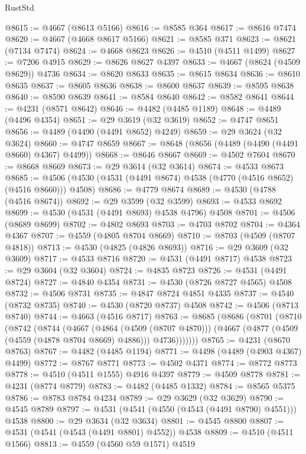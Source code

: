 \begin{lexlean}{RustStd}
\begin{coremodule}
@8615 := @4667 (@8613 @5166)
@8616 := @8585 @364
@8617 := @8616 @7474
@8620 := @4667 (@4668 @8617 @5166)
@8621 := @8585 @371
@8623 := @8621 (@7134 @7474)
@8624 := @4668 @8623
@8626 := @4510 (@4511 @1499)
@8627 := @7206 @4915
@8629 := @8626 @8627 @4397
@8633 := @4667 (@8624 (@4509 @8629)) @4736
@8634 := @8620 @8633
@8635 := @8615 @8634
@8636 := @8610 @8635
@8637 := @8605 @8636
@8638 := @8600 @8637
@8639 := @8595 @8638
@8640 := @8590 @8639
@8641 := @8584 @8640
@8642 := @8582 @8641
@8644 := @4231 (@8571 @8642)
@8646 := @4482 (@4485 @1189)
@8648 := @4489 (@4496 @4354)
@8651 := @29 @3619 (@32 @3619)
@8652 := @4747 @8651
@8656 := @4489 (@4490 (@4491 @8652) @4249)
@8659 := @29 @3624 (@32 @3624)
@8660 := @4747 @8659
@8667 := @8648 (@8656 (@4489 (@4490 (@4491 @8660) @4367) @4499))
@8668 := @8646 @8667
@8669 := @4502 @7604
@8670 := @8668 @8669
@8673 := @29 @3614 (@32 @3614)
@8674 := @4533 @8673
@8685 := @4506 (@4530 (@4531 (@4491 @8674) @4538 (@4770 (@4516 @8652) (@4516 @8660))) @4508)
@8686 := @4779 @8674
@8689 := @4530 (@4788 (@4516 @8674))
@8692 := @29 @3599 (@32 @3599)
@8693 := @4533 @8692
@8699 := @4530 (@4531 (@4491 @8693) @4538 @4796) @4508
@8701 := @4506 (@8689 @8699)
@8702 := @4802 @8693
@8703 := @4703 @8702
@8704 := @4364 @4367
@8707 := @4559 (@4805 @8704 @8669)
@8710 := @8703 (@4509 (@8707 @4818))
@8713 := @4530 (@4825 (@4826 @8693))
@8716 := @29 @3609 (@32 @3609)
@8717 := @4533 @8716
@8720 := @4531 (@4491 @8717) @4538
@8723 := @29 @3604 (@32 @3604)
@8724 := @4835 @8723
@8726 := @4531 (@4491 @8724)
@8727 := @4840 @4354
@8731 := @4530 (@8726 @8727 @4565) @4508
@8732 := @4506 @8731
@8735 := @4847 @8724 @4851 @4335
@8737 := @4540 (@8732 @8735)
@8740 := @4530 (@8720 @8737) @4508
@8742 := @4506 (@8713 @8740)
@8744 := @4663 (@4516 @8717)
@8763 := @8685
    (@8686
      (@8701
        (@8710
          (@8742
            (@8744
              (@4667
                (@4864 (@4509 (@8707 @4870)))
                (@4667 (@4877 (@4509 (@4559 (@4878 @8704 @8669) @4886))) @4736)))))))
@8765 := @4231 (@8670 @8763)
@8767 := @4482 (@4485 @1194)
@8771 := @4498 (@4489 (@4903 @4367) @4499)
@8772 := @8767 @8771
@8773 := @4502 @4371
@8774 := @8772 @8773
@8778 := @4510 (@4511 @1555) @4916 @4397
@8779 := @4509 @8778
@8781 := @4231 (@8774 @8779)
@8783 := @4482 (@4485 @1332)
@8784 := @8565 @5375
@8786 := @8783 @8784 @4234
@8789 := @29 @3629 (@32 @3629)
@8790 := @4545 @8789
@8797 := @4531 (@4541 (@4550 (@4543 (@4491 @8790) @4551))) @4538
@8800 := @29 @3634 (@32 @3634)
@8801 := @4545 @8800
@8807 := @4531 (@4541 (@4543 (@4491 @8801) @4552)) @4538
@8809 := @4510 (@4511 @1566)
@8813 := @4559 (@4560 @59 @1571) @4519

\end{coremodule}
\end{lexlean}
